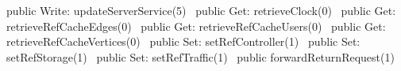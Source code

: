public \LA{}Write: updateServerService(5)~{\nwtagstyle{}}\RA{}
\nwendcode{}\nwdocspar
{}
\nwenddocs{}\plusendmoddef
public \LA{}Get: retrieveClock(0)~{\nwtagstyle{}}\RA{}
public \LA{}Get: retrieveRefCacheEdges(0)~{\nwtagstyle{}}\RA{}
public \LA{}Get: retrieveRefCacheUsers(0)~{\nwtagstyle{}}\RA{}
public \LA{}Get: retrieveRefCacheVertices(0)~{\nwtagstyle{}}\RA{}
public \LA{}Set: setRefController(1)~{\nwtagstyle{}}\RA{}
public \LA{}Set: setRefStorage(1)~{\nwtagstyle{}}\RA{}
public \LA{}Set: setRefTraffic(1)~{\nwtagstyle{}}\RA{}
public \LA{}forwardReturnRequest(1)~{\nwtagstyle{}}\RA{}
\nwendcode{}\nwdocspar

